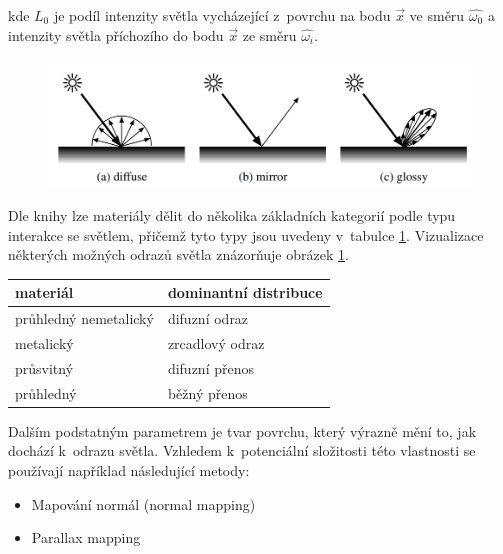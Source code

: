 kde $L_0$ je podíl intenzity světla vycházející z~povrchu na bodu $\vec{x}$ ve směru $\hat{\omega_0}$ a intenzity světla příchozího do bodu $\vec{x}$ ze směru $\hat{\omega_i}$.

\begin{figure}[H]
	\centering
	\includegraphics[scale=1]{obrazky-figures/reflection_types.png}
	\captionsetup{justification=centering}
	\label{fig:refl_types}
\end{figure}

Dle knihy \cite{hunter_harold_1987} lze materiály dělit do několika základních kategorií podle typu interakce se světlem, přičemž tyto typy jsou uvedeny v~tabulce \ref{tab:mats_distr}. Vizualizace některých možných odrazů světla znázorňuje obrázek \ref{fig:refl_types}.

\begin{table}[H]
	\centering
	\begin{tabular}{|l|l|}
		\hline
		materiál              & dominantní distribuce \\ \hline
		průhledný nemetalický & difuzní odraz         \\ \hline
		metalický             & zrcadlový odraz       \\ \hline
		průsvitný             & difuzní přenos        \\ \hline
		průhledný             & běžný přenos          \\ \hline
	\end{tabular}
	\captionsetup{justification=centering}
	\label{tab:mats_distr}
\end{table}


Dalším podstatným parametrem je tvar povrchu, který výrazně mění to, jak dochází k~odrazu světla. Vzhledem k~potenciální složitosti této vlastnosti se používají například následující metody:

\begin{itemize}
	\item Mapování normál (normal mapping)
	\item Parallax mapping
\end{itemize}

